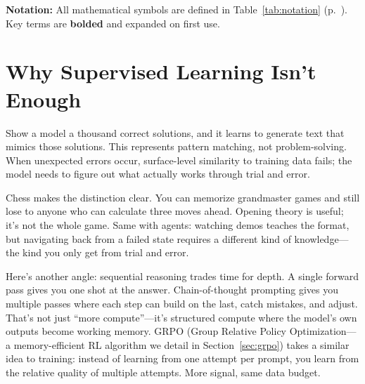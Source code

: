 \documentclass[12pt,a4paper]{report}
\theoremstyle{definition}
\begin{document}
\textbf{Notation:} All mathematical symbols are defined in Table~\ref{tab:notation} (p.~\pageref{tab:notation}). Key terms are \textbf{bolded} and expanded on first use.

\section{Why Supervised Learning Isn't Enough}
Show a model a thousand correct solutions, and it learns to generate text that mimics those solutions. This represents pattern matching, not problem-solving. When unexpected errors occur, surface-level similarity to training data fails; the model needs to figure out what actually works through trial and error.

Chess makes the distinction clear. You can memorize grandmaster games and still lose to anyone who can calculate three moves ahead. Opening theory is useful; it's not the whole game. Same with agents: watching demos teaches the format, but navigating back from a failed state requires a different kind of knowledge---the kind you only get from trial and error.

Here's another angle: sequential reasoning trades time for depth. A single forward pass gives you one shot at the answer. Chain-of-thought prompting gives you multiple passes where each step can build on the last, catch mistakes, and adjust. That's not just ``more compute''---it's structured compute where the model's own outputs become working memory. GRPO (Group Relative Policy Optimization---a memory-efficient RL algorithm we detail in Section~\ref{sec:grpo}) takes a similar idea to training: instead of learning from one attempt per prompt, you learn from the relative quality of multiple attempts. More signal, same data budget.
\end{document}

